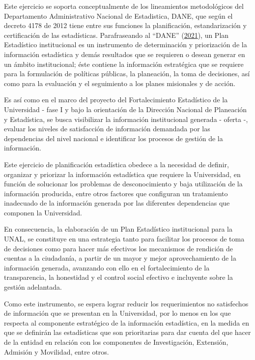 \documentclass[
]{book}
\begin{document}
Este ejercicio se soporta conceptualmente de los lineamientos metodológicos del Departamento Administrativo Nacional de Estadistica, DANE, que según el decreto 4178 de 2012 tiene entre sus funciones la planificación, estandarización y certificación de las estadísticas. Parafraseando al {``{DANE}''} (\protect\hyperlink{ref-BibEntry2021Apr}{2021}), un Plan Estadístico institucional es un instrumento de determinación y priorización de la información estadística y demás resultados que se requieren o desean generar en un ámbito institucional; éste contiene la información estratégica que se requiere para la formulación de políticas públicas, la planeación, la toma de decisiones, así como para la evaluación y el seguimiento a los planes misionales y de acción.

Es así como en el marco del proyecto del Fortalecimiento Estadístico de la Universidad - fase I y bajo la orientación de la Dirección Nacional de Planeación y Estadística, se busca visibilizar la información institucional generada - oferta -, evaluar los niveles de satisfacción de información demandada por las dependencias del nivel nacional e identificar los procesos de gestión de la información.

Este ejercicio de planificación estadística obedece a la necesidad de definir, organizar y priorizar la información estadística que requiere la Universidad, en función de solucionar los problemas de desconocimiento y baja utilización de la información producida, entre otros factores que configuran un tratamiento inadecuado de la información generada por las diferentes dependencias que componen la Universidad.

En consecuencia, la elaboración de un Plan Estadístico institucional para la UNAL, se constituye en una estrategia tanto para facilitar los procesos de toma de decisiones como para hacer más efectivos los mecanismos de rendición de cuentas a la ciudadanía, a partir de un mayor y mejor aprovechamiento de la información generada, avanzando con ello en el fortalecimiento de la transparencia, la honestidad y el control social efectivo e incluyente sobre la gestión adelantada.

Como este instrumento, se espera lograr reducir los requerimientos no satisfechos de información que se presentan en la Universidad, por lo menos en los que respecta al componente estratégico de la información estadística, en la medida en que se definirán las estadísticas que son prioritarias para dar cuenta del que hacer de la entidad en relación con los componentes de Investigación, Extensión, Admisión y Movilidad, entre otros.
\end{document}
